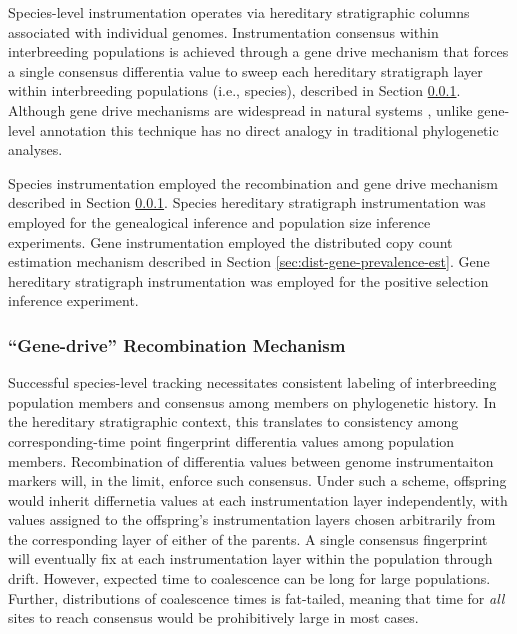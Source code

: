 Species-level instrumentation operates via hereditary stratigraphic columns associated with individual genomes.
Instrumentation consensus within interbreeding populations is achieved through a gene drive mechanism that forces a single consensus differentia value to sweep each hereditary stratigraph layer within interbreeding populations (i.e., species), described in Section \ref{sec:gene-drive}.
Although gene drive mechanisms are widespread in natural systems \citep{alphey2020standardizing, price2020resistance}, unlike gene-level annotation this technique has no direct analogy in traditional phylogenetic analyses.

Species instrumentation employed the recombination and gene drive mechanism described in Section \ref{sec:gene-drive}.
Species hereditary stratigraph instrumentation was employed for the genealogical inference and population size inference experiments.
Gene instrumentation employed the distributed copy count estimation mechanism described in Section \ref{sec:dist-gene-prevalence-est}.
Gene hereditary stratigraph instrumentation was employed for the positive selection inference experiment.

\subsubsection{``Gene-drive'' Recombination Mechanism}
\label{sec:gene-drive}



Successful species-level tracking necessitates consistent labeling of interbreeding population members and consensus among members on phylogenetic history.
In the hereditary stratigraphic context, this translates to consistency among corresponding-time point fingerprint differentia values among population members.
Recombination of differentia values between genome instrumentaiton markers will, in the limit, enforce such consensus.
Under such a scheme, offspring would inherit differnetia values at each instrumentation layer independently, with values assigned to the offspring's instrumentation layers chosen arbitrarily from the corresponding layer of either of the parents.
A single consensus fingerprint will eventually fix at each instrumentation layer within the population through drift.
However, expected time to coalescence can be long for large populations.
Further, distributions of coalescence times is fat-tailed, meaning that time for \textit{all} sites to reach consensus would be prohibitively large in most cases.

